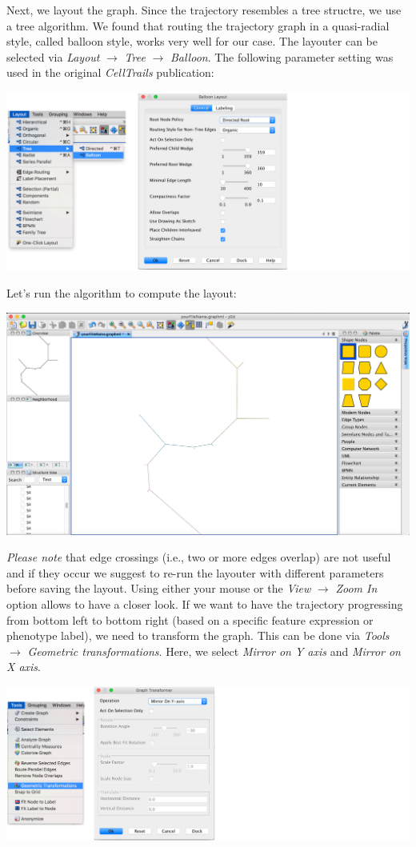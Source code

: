 \documentclass[]{book}
\theoremstyle{definition}
\theoremstyle{definition}
\theoremstyle{definition}
\theoremstyle{remark}
\begin{document}
Next, we layout the graph. Since the trajectory resembles a tree
structre, we use a tree algorithm. We found that routing the trajectory
graph in a quasi-radial style, called balloon style, works very well for
our case. The layouter can be selected via \emph{Layout} \(\rightarrow\)
\emph{Tree} \(\rightarrow\) \emph{Balloon}. The following parameter
setting was used in the original \emph{CellTrails} publication:

\includegraphics[width=0.7\linewidth]{img/yEd_2-3}

Let's run the algorithm to compute the layout:

\includegraphics[width=0.7\linewidth]{img/yEd_4}

\emph{Please note} that edge crossings (i.e., two or more edges overlap)
are not useful and if they occur we suggest to re-run the layouter with
different parameters before saving the layout. Using either your mouse
or the \emph{View} \(\rightarrow\) \emph{Zoom In} option allows to have
a closer look. If we want to have the trajectory progressing from bottom
left to bottom right (based on a specific feature expression or
phenotype label), we need to transform the graph. This can be done via
\emph{Tools} \(\rightarrow\) \emph{Geometric transformations}. Here, we
select \emph{Mirror on Y axis} and \emph{Mirror on X axis}.

\includegraphics[width=0.7\linewidth]{img/yEd_5-6}
\end{document}
